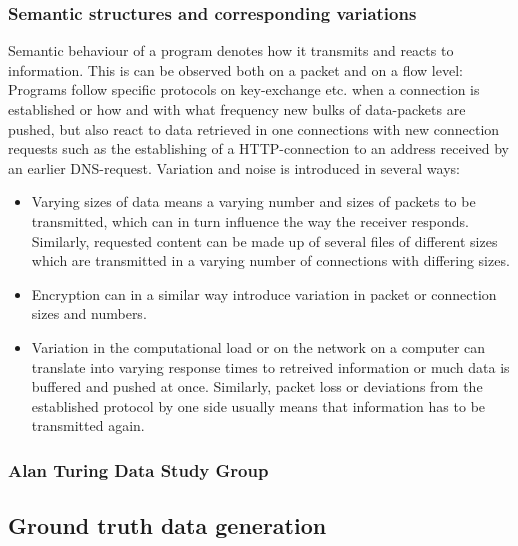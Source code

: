 \documentclass[a4paper,12pt,twoside]{report}
\begin{document}
\subsubsection{Semantic structures and corresponding variations}

Semantic behaviour of a program denotes how it transmits and reacts to information. This is can be observed both on a packet and on a flow level: Programs follow specific protocols on key-exchange etc. when a connection is established or how and with what frequency new bulks of data-packets are pushed, but also react to data retrieved in one connections with new connection requests such as the establishing of a HTTP-connection to an address received by an earlier DNS-request. Variation and noise is introduced in several ways:

\begin{itemize}

\item Varying sizes of data means a varying number and sizes of packets to be transmitted, which can in turn influence the way the receiver responds. Similarly, requested content can be made up of several files of different sizes which are transmitted in a varying number of connections with differing sizes.
\item Encryption can in a similar way introduce variation in packet or connection sizes and numbers.
\item Variation in the computational load or on the network on a computer can translate into varying response times to retreived information or much data is buffered and pushed at once. Similarly, packet loss or deviations from the established protocol by one side usually means that information has to be transmitted again.

\end{itemize}



\subsubsection{Alan Turing Data Study Group}



\subsection{Ground truth data generation}
\end{document}
